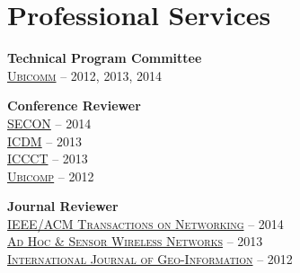 \section{\sc Professional Services}
{\bf Technical Program Committee}\\
{\href{http://www.iaria.org/conferences.html}{\textsc{Ubicomm}}} -- 2012, 2013, 2014

{\bf Conference Reviewer}\\
{\href{http://secon2014.ieee-secon.org}{\textsc{SECON}}} -- 2014\\
{\href{http://icdm2013.rutgers.edu}{\textsc{ICDM}}} -- 2013\\
{\href{http://www.mnnit.ac.in/iccct2013}{\textsc{ICCCT}}} -- 2013\\
{\href{http://www.ubicomp.org/ubicomp2012}{\textsc{Ubicomp}}} -- 2012

{\bf Journal Reviewer}\\
{\href{http://www.ifp.illinois.edu/ton/}{\textsc{IEEE/ACM Transactions on Networking}}} -- 2014\\
{\href{http://www.oldcitypublishing.com/AHSWN/AHSWN.html}{\textsc{Ad Hoc \& Sensor Wireless Networks}}} -- 2013\\
{\href{http://www.mdpi.com/journal/ijgi}{\textsc{International Journal of Geo-Information}}} -- 2012
